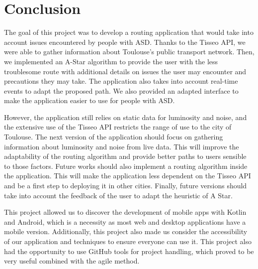 \section{Conclusion}


The goal of this project was to develop a routing application that would take into account issues encountered by people with ASD. Thanks to the Tisseo API, we were able to gather information about Toulouse's public transport network. Then, we implemented an A-Star algorithm to provide the user with the less troublesome route with additional details on issues the user may encounter and precautions they may take. The application also takes into account real-time events to adapt the proposed path. We also provided an adapted interface to make the application easier to use for people with ASD.


However, the application still relies on static data for luminosity and noise, and the extensive use of the Tisseo API restricts the range of use to the city of Toulouse. The next version of the application should focus on gathering information about luminosity and noise from live data. This will improve the adaptability of the routing algorithm and provide better paths to users sensible to those factors. Future works should also implement a routing algorithm inside the application. This will make the application less dependent on the Tisseo API and be a first step to deploying it in other cities. Finally, future versions should take into account the feedback of the user to adapt the heuristic of A Star.


This project allowed us to discover the development of mobile apps with Kotlin and Android, which is a necessity as most web and desktop applications have a mobile version. Additionally, this project also made us consider the accessibility of our application and techniques to ensure everyone can use it. This project also had the opportunity to use GitHub tools for project handling, which proved to be very useful combined with the agile method.
